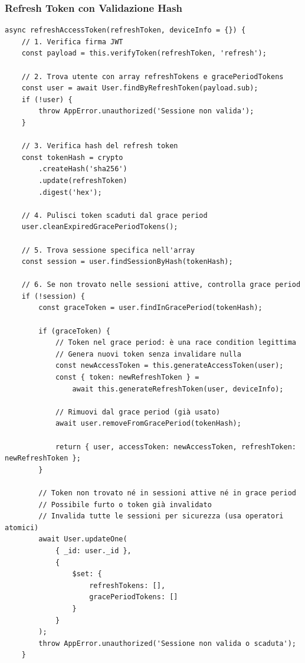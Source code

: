 \documentclass[11pt,a4paper]{article}
\begin{document}
\subsubsection{Refresh Token con Validazione Hash}

\begin{lstlisting}[caption=Refresh Token con Validazione Multi-Sessione e Grace Period]
async refreshAccessToken(refreshToken, deviceInfo = {}) {
    // 1. Verifica firma JWT
    const payload = this.verifyToken(refreshToken, 'refresh');

    // 2. Trova utente con array refreshTokens e gracePeriodTokens
    const user = await User.findByRefreshToken(payload.sub);
    if (!user) {
        throw AppError.unauthorized('Sessione non valida');
    }

    // 3. Verifica hash del refresh token
    const tokenHash = crypto
        .createHash('sha256')
        .update(refreshToken)
        .digest('hex');

    // 4. Pulisci token scaduti dal grace period
    user.cleanExpiredGracePeriodTokens();

    // 5. Trova sessione specifica nell'array
    const session = user.findSessionByHash(tokenHash);
    
    // 6. Se non trovato nelle sessioni attive, controlla grace period
    if (!session) {
        const graceToken = user.findInGracePeriod(tokenHash);
        
        if (graceToken) {
            // Token nel grace period: è una race condition legittima
            // Genera nuovi token senza invalidare nulla
            const newAccessToken = this.generateAccessToken(user);
            const { token: newRefreshToken } = 
                await this.generateRefreshToken(user, deviceInfo);
            
            // Rimuovi dal grace period (già usato)
            await user.removeFromGracePeriod(tokenHash);
            
            return { user, accessToken: newAccessToken, refreshToken: newRefreshToken };
        }
        
        // Token non trovato né in sessioni attive né in grace period
        // Possibile furto o token già invalidato
        // Invalida tutte le sessioni per sicurezza (usa operatori atomici)
        await User.updateOne(
            { _id: user._id },
            {
                $set: { 
                    refreshTokens: [],
                    gracePeriodTokens: []
                }
            }
        );
        throw AppError.unauthorized('Sessione non valida o scaduta');
    }


\end{lstlisting}
\end{document}
